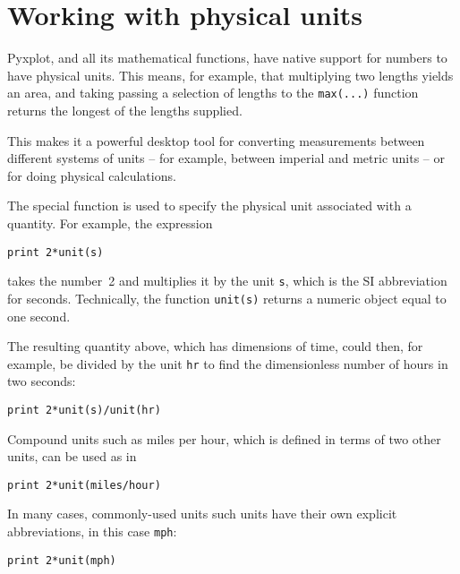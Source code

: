 \vspace{3mm}

\vspace{3mm}

\section{Working with physical units}
\label{sec:units}

Pyxplot, and all its mathematical functions, have native support for numbers to
have physical units. This means, for example, that multiplying two lengths
yields an area, and taking passing a selection of lengths to the {\tt max(...)}
function returns the longest of the lengths supplied.

This makes it a powerful desktop tool for converting measurements between
different systems of units -- for example, between imperial and metric units --
or for doing physical calculations.

The special function  is used to specify the physical unit
associated with a quantity. For example, the expression

\begin{verbatim}
print 2*unit(s)
\end{verbatim}

\noindent takes the number~2 and multiplies it by the unit {\tt s}, which is
the SI abbreviation for seconds. Technically, the function {\tt unit(s)}
returns a numeric object equal to one second.

The resulting quantity above, which has dimensions of time, could then, for
example, be divided by the unit {\tt hr} to find the dimensionless number of
hours in two seconds:

\begin{verbatim}
print 2*unit(s)/unit(hr)
\end{verbatim}

Compound units such as miles per hour, which is defined in terms of two other
units, can be used as in

\begin{verbatim}
print 2*unit(miles/hour)
\end{verbatim}

\noindent In many cases, commonly-used units such units have their own explicit
abbreviations, in this case {\tt mph}:

\begin{verbatim}
print 2*unit(mph)
\end{verbatim}

